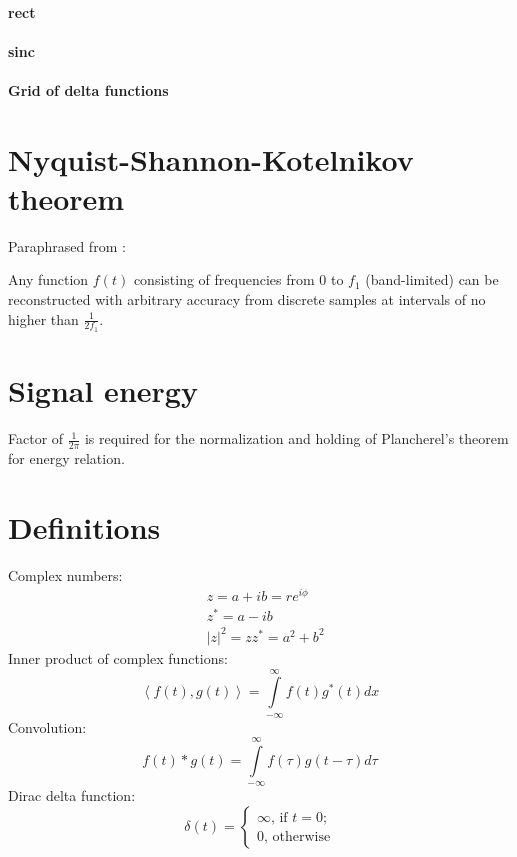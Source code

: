 \documentclass{article}
\begin{document}
\paragraph{rect}

\paragraph{sinc}

\paragraph{Grid of delta functions}

\section{Nyquist-Shannon-Kotelnikov theorem}

Paraphrased from \cite{nyquist_certain_1928,shannon_communication_1949,kotelnikov_transmission_2006}:
\begin{displayquote}
Any function $f(t)$ consisting of frequencies from $0$ to $f_1$ (band-limited) can be 
reconstructed with arbitrary accuracy from discrete samples at intervals of no higher than $\frac{1}{2f_1}$.
\end{displayquote}

\section{Signal energy}
Factor of $\frac{1}{2 \pi}$ is required for the normalization and holding of Plancherel's theorem for energy relation.


\section{Definitions}
Complex numbers:
\begin{align*}
    &z = a + ib = r e^{i\phi} \\
    &z^* = a - ib \\
    &\left| z \right| ^2 = z z^* = a^2 + b^2
\end{align*}
Inner product of complex functions:
\begin{equation*}
    \left< f(t),g(t) \right> = \int \limits^{\infty}_{-\infty} f(t) g^{*}(t) dx
\end{equation*}
Convolution:
\begin{equation*}
f(t) * g(t) =  \int \limits^{\infty}_{-\infty} f(\tau ) g(t - \tau) d \tau
\end{equation*}
Dirac delta function:
\begin{equation*}
    \delta(t) =  \begin{cases}
        \infty, \, \text{if $t = 0$};\\
        0, \, \text{otherwise}
    \end{cases}
\end{equation*}
\end{document}

